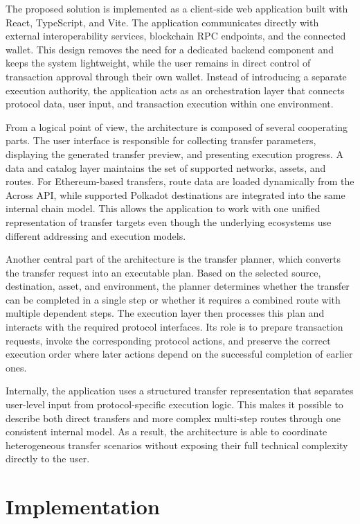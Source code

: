 \documentclass[conference]{IEEEtran}
\begin{document}
The proposed solution is implemented as a client-side web application built with React, TypeScript, and Vite. The application communicates directly with external interoperability services, blockchain RPC endpoints, and the connected wallet. This design removes the need for a dedicated backend component and keeps the system lightweight, while the user remains in direct control of transaction approval through their own wallet. Instead of introducing a separate execution authority, the application acts as an orchestration layer that connects protocol data, user input, and transaction execution within one environment.

From a logical point of view, the architecture is composed of several cooperating parts. The user interface is responsible for collecting transfer parameters, displaying the generated transfer preview, and presenting execution progress. A data and catalog layer maintains the set of supported networks, assets, and routes. For Ethereum-based transfers, route data are loaded dynamically from the Across API, while supported Polkadot destinations are integrated into the same internal chain model. This allows the application to work with one unified representation of transfer targets even though the underlying ecosystems use different addressing and execution models.

Another central part of the architecture is the transfer planner, which converts the transfer request into an executable plan. Based on the selected source, destination, asset, and environment, the planner determines whether the transfer can be completed in a single step or whether it requires a combined route with multiple dependent steps. The execution layer then processes this plan and interacts with the required protocol interfaces. Its role is to prepare transaction requests, invoke the corresponding protocol actions, and preserve the correct execution order where later actions depend on the successful completion of earlier ones.

Internally, the application uses a structured transfer representation that separates user-level input from protocol-specific execution logic. This makes it possible to describe both direct transfers and more complex multi-step routes through one consistent internal model. As a result, the architecture is able to coordinate heterogeneous transfer scenarios without exposing their full technical complexity directly to the user.


\section{Implementation}
\end{document}
